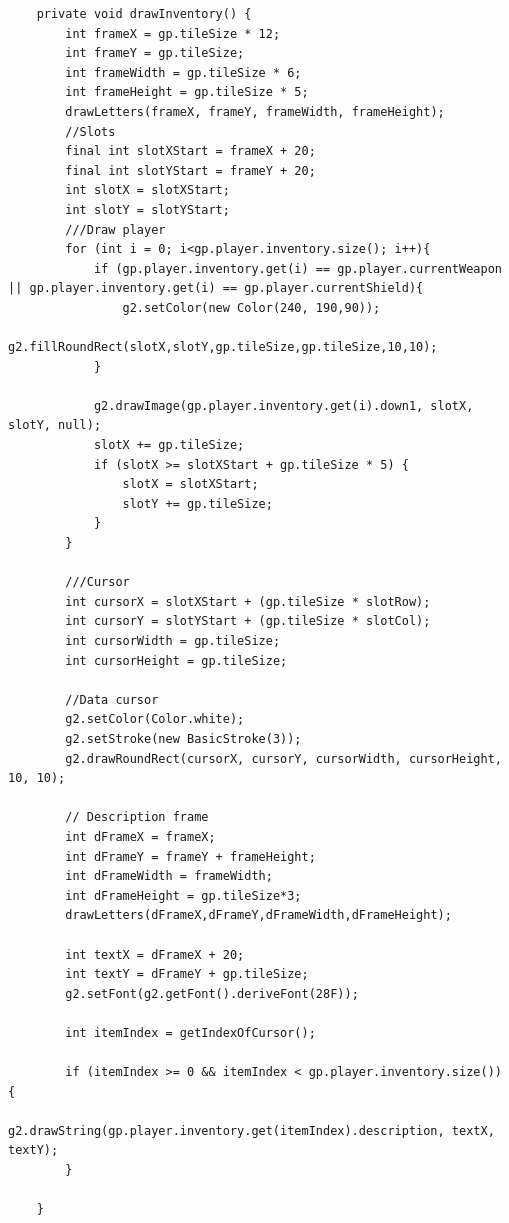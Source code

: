 \documentclass[a4paper]{article}
\begin{document}
\begin{lstlisting}
    private void drawInventory() {
        int frameX = gp.tileSize * 12;
        int frameY = gp.tileSize;
        int frameWidth = gp.tileSize * 6;
        int frameHeight = gp.tileSize * 5;
        drawLetters(frameX, frameY, frameWidth, frameHeight);
        //Slots
        final int slotXStart = frameX + 20;
        final int slotYStart = frameY + 20;
        int slotX = slotXStart;
        int slotY = slotYStart;
        ///Draw player
        for (int i = 0; i<gp.player.inventory.size(); i++){
            if (gp.player.inventory.get(i) == gp.player.currentWeapon || gp.player.inventory.get(i) == gp.player.currentShield){
                g2.setColor(new Color(240, 190,90));
                g2.fillRoundRect(slotX,slotY,gp.tileSize,gp.tileSize,10,10);
            }

            g2.drawImage(gp.player.inventory.get(i).down1, slotX, slotY, null);
            slotX += gp.tileSize;
            if (slotX >= slotXStart + gp.tileSize * 5) { 
                slotX = slotXStart;
                slotY += gp.tileSize;
            }
        }

        ///Cursor
        int cursorX = slotXStart + (gp.tileSize * slotRow);
        int cursorY = slotYStart + (gp.tileSize * slotCol);
        int cursorWidth = gp.tileSize;
        int cursorHeight = gp.tileSize;

        //Data cursor
        g2.setColor(Color.white);
        g2.setStroke(new BasicStroke(3));
        g2.drawRoundRect(cursorX, cursorY, cursorWidth, cursorHeight, 10, 10);

        // Description frame
        int dFrameX = frameX;
        int dFrameY = frameY + frameHeight;
        int dFrameWidth = frameWidth;
        int dFrameHeight = gp.tileSize*3;
        drawLetters(dFrameX,dFrameY,dFrameWidth,dFrameHeight);

        int textX = dFrameX + 20;
        int textY = dFrameY + gp.tileSize;
        g2.setFont(g2.getFont().deriveFont(28F));

        int itemIndex = getIndexOfCursor();

        if (itemIndex >= 0 && itemIndex < gp.player.inventory.size()) {
            g2.drawString(gp.player.inventory.get(itemIndex).description, textX, textY);
        }

    }
\end{lstlisting}


\clearpage
\end{document}
